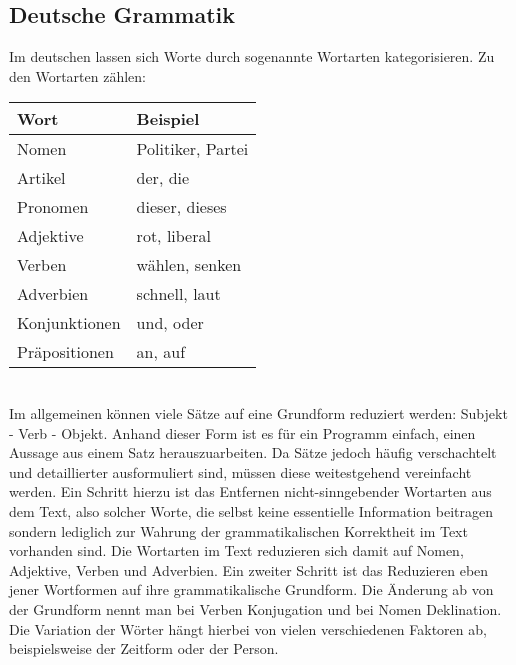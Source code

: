 \subsection{Deutsche Grammatik	}
Im deutschen lassen sich Worte durch sogenannte Wortarten kategorisieren. Zu den Wortarten zählen: \\
\begin{tabular}{ll}
\hline
Wort & Beispiel \\
\hline
Nomen & Politiker, Partei \\
Artikel & der, die \\
Pronomen & dieser, dieses \\
Adjektive & rot, liberal \\
Verben & wählen, senken \\
Adverbien & schnell, laut \\
Konjunktionen & und, oder \\
Präpositionen & an, auf \\
\hline
\end{tabular} \\
Im allgemeinen können viele Sätze auf eine Grundform reduziert werden: Subjekt - Verb - Objekt. Anhand dieser Form ist es für ein Programm einfach,
einen Aussage aus einem Satz herauszuarbeiten. Da Sätze jedoch häufig verschachtelt und detaillierter ausformuliert sind, müssen diese weitestgehend vereinfacht
werden. Ein Schritt hierzu ist das Entfernen nicht-sinngebender Wortarten aus dem Text, also solcher Worte, die selbst keine essentielle Information beitragen 
sondern lediglich zur Wahrung der grammatikalischen Korrektheit im Text vorhanden sind. Die Wortarten im Text reduzieren sich damit auf Nomen, Adjektive, Verben
und Adverbien.
Ein zweiter Schritt ist das Reduzieren eben jener Wortformen auf ihre grammatikalische Grundform. Die Änderung ab von der Grundform nennt man bei Verben Konjugation
und bei Nomen Deklination. Die Variation der Wörter hängt hierbei von vielen verschiedenen Faktoren ab, beispielsweise der Zeitform oder der Person.

